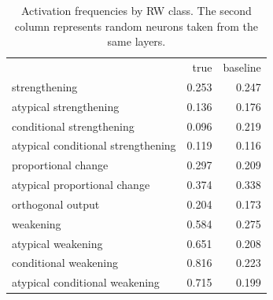 \begin{table}
\caption{
                Activation frequencies by RW class.
                The second column represents random neurons taken from the same layers.
                }
\label{tab:summary}
\begin{tabular}{lrr}
 & true & baseline \\
strengthening & 0.253 & 0.247 \\
atypical strengthening & 0.136 & 0.176 \\
conditional strengthening & 0.096 & 0.219 \\
atypical conditional strengthening & 0.119 & 0.116 \\
proportional change & 0.297 & 0.209 \\
atypical proportional change & 0.374 & 0.338 \\
orthogonal output & 0.204 & 0.173 \\
weakening & 0.584 & 0.275 \\
atypical weakening & 0.651 & 0.208 \\
conditional weakening & 0.816 & 0.223 \\
atypical conditional weakening & 0.715 & 0.199 \\
\end{tabular}
\end{table}
